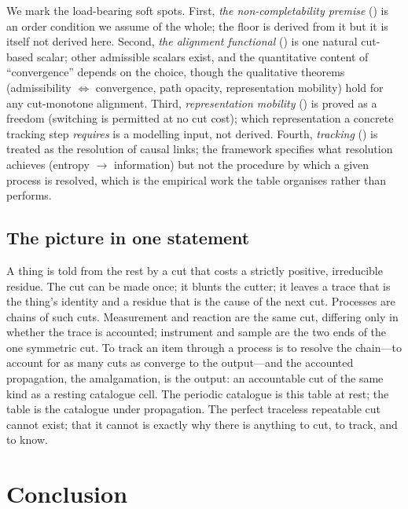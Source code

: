 \documentclass[11pt,twocolumn,a4paper]{article}
\theoremstyle{thmstyle}
\theoremstyle{definition}
\theoremstyle{remark}
\begin{document}
We mark the load-bearing soft spots. First, \emph{the non-completability
premise} () is an order condition we assume of the
whole; the floor is derived from it but it is itself not derived here.
Second, \emph{the alignment functional} () is one
natural cut-based scalar; other admissible scalars exist, and the
quantitative content of ``convergence'' depends on the choice, though the
qualitative theorems (admissibility $\iff$ convergence, path opacity,
representation mobility) hold for any cut-monotone alignment. Third,
\emph{representation mobility} () is proved as a
freedom (switching is permitted at no cut cost); which representation a
concrete tracking step \emph{requires} is a modelling input, not derived.
Fourth, \emph{tracking} () is treated as the
resolution of causal links; the framework specifies what resolution
achieves (entropy $\to$ information) but not the procedure by which a given
process is resolved, which is the empirical work the table organises rather
than performs.

\subsection{The picture in one statement}

A thing is told from the rest by a cut that costs a strictly positive,
irreducible residue. The cut can be made once; it blunts the cutter; it
leaves a trace that is the thing's identity and a residue that is the cause
of the next cut. Processes are chains of such cuts. Measurement and
reaction are the same cut, differing only in whether the trace is
accounted; instrument and sample are the two ends of the one symmetric cut.
To track an item through a process is to resolve the chain---to account for
as many cuts as converge to the output---and the accounted propagation, the
amalgamation, is the output: an accountable cut of the same kind as a
resting catalogue cell. The periodic catalogue is this table at rest; the
table is the catalogue under propagation. The perfect traceless repeatable
cut cannot exist; that it cannot is exactly why there is anything to cut,
to track, and to know.

\section{Conclusion}
\label{sec:conclusion}
\end{document}
